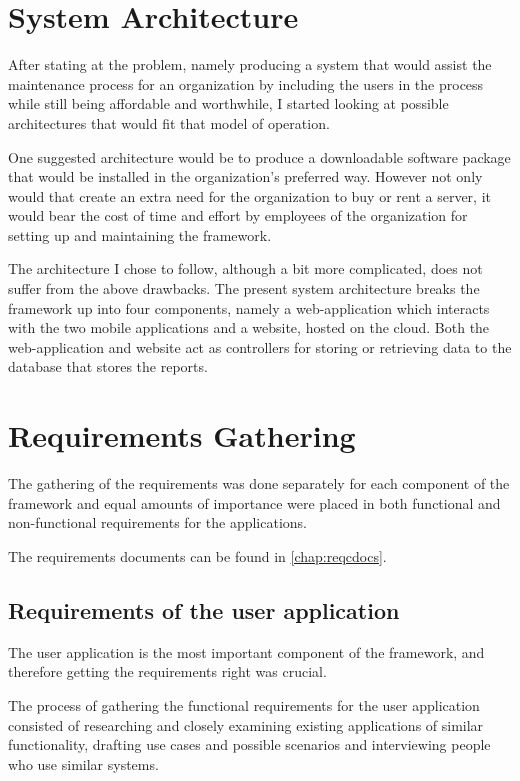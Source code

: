 \documentclass[12pt]{ecsproject}     %
\begin{document}
\section{System Architecture}
After stating at the problem, namely producing a system that would assist the maintenance process for an organization by including the users in the process while still being affordable and worthwhile, I started looking at possible architectures that would fit that model of operation.

One suggested architecture would be to produce a downloadable software package that would be installed in the organization's preferred way. However not only would that create an extra need for the organization to buy or rent a server, it would bear the cost of time and effort by employees of the organization for setting up and maintaining the framework.

The architecture I chose to follow, although a bit more complicated, does not suffer from the above drawbacks. The present system architecture breaks the framework up into four components, namely a web-application which interacts with the two mobile applications and a website, hosted on the cloud. Both the web-application and website act as controllers for storing or retrieving data to the database that stores the reports. 

\section{Requirements Gathering}
The gathering of the requirements was done separately for each component of the framework and equal amounts of importance were placed in both functional and non-functional requirements for the applications.

The requirements documents can be found in \ref{chap:reqcdocs}.

\subsection{Requirements of the user application}
The user application is the most important component of the framework, and therefore getting the requirements right was crucial.

The process of gathering the functional requirements for the user application consisted of researching and closely examining existing applications of similar functionality, drafting use cases and possible scenarios and interviewing people who use similar systems.
\end{document}
